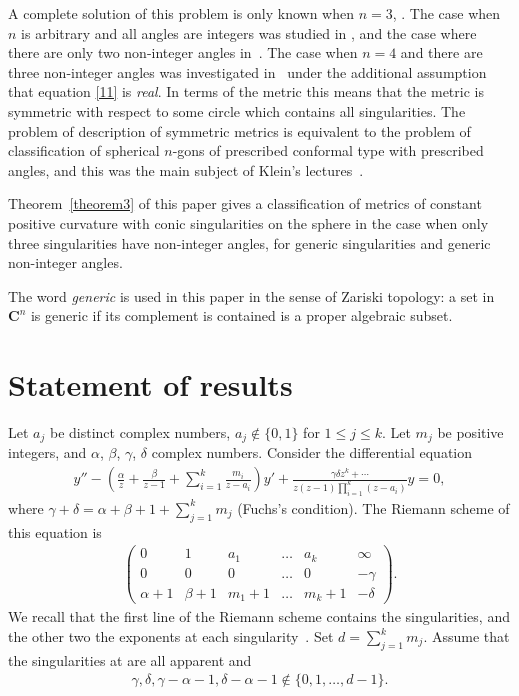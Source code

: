 \documentclass[pdftex]{sigma}
\numberwithin{equation}{section}
\def\C{\mathbf{C}}
\def\lc{,\allowbreak\ldots,\allowbreak}
\begin{document}
A complete solution of this problem is only known when $n=3$, \cite{E, FKKRUY}. The case when $n$ is arbitrary and all angles are integers was studied in \cite{Sch}, and the case where there are only two non-integer
angles in~\cite{EGT1}. The case when $n=4$ and there are three non-integer angles was investigated in~\cite{EGT} under the additional assumption that equation \eqref{11} is {\em real}. In terms of the metric this means that the metric is symmetric with respect to some circle which contains all singularities. The problem of description of symmetric metrics is equivalent to the problem of classification of spherical $n$-gons of prescribed conformal type with prescribed angles, and this was the main subject of Klein's lectures~\cite{K}.

Theorem~\ref{theorem3} of this paper gives a classification of metrics of constant positive curvature with conic singularities on the sphere in the case when only three singularities have non-integer angles, for generic singularities and generic non-integer angles.

The word {\em generic} is used in this paper in the sense of Zariski topology: a set in $\C^n$ is generic if its complement is contained is a proper algebraic subset.

\section{Statement of results}\label{section2}

Let $a_j$ be distinct complex numbers, $a_j\not\in\{0,1\}$ for $1\leq j\leq k$. Let $m_j$ be positive integers, and $\alpha$, $\beta$, $\gamma$, $\delta$ complex numbers. Consider the differential equation
\begin{gather}\label{1a}
y''-\left( \frac\alpha z+\frac\beta{z-1}+\sum_{i=1}^k \frac{m_i}{z-a_i}\right) y'+\frac{\gamma\delta z^k+\cdots{}}{z(z-1)\prod\limits_{i=1}^k(z-a_i)}y = 0,
\end{gather}
where $\gamma+\delta=\alpha+\beta+1+\sum\limits_{j=1}^km_j$ (Fuchs's condition). The Riemann scheme of this equation is
\begin{gather*}
\left(\begin{matrix}
0&1&a_1&\ldots&a_k&\infty\\
0&0&0&\ldots&0&-\gamma\\
\alpha+1&\beta+1&m_1+1&\ldots&m_k+1&-\delta
\end{matrix}\right).
\end{gather*}
We recall that the first line of the Riemann scheme contains the singularities, and the other two the exponents at each singularity~\cite{Mellin}. Set $d=\sum\limits_{j=1}^km_j$. Assume that the singularities at \smash{$a_1\lc a_k$} are all apparent and
\begin{gather}\label{0d}
\gamma, \delta, \gamma-\alpha-1, \delta-\alpha-1 \not\in \{0,1\lc d-1\}.
\end{gather}
\end{document}
